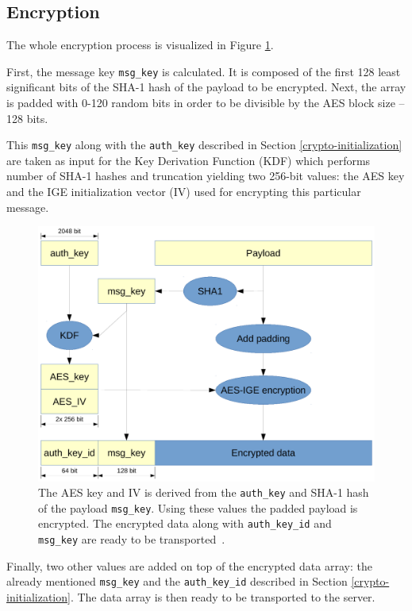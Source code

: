 \documentclass[thesis=M,english]{FITthesis}[2012/10/20]
\begin{document}
\subsection{Encryption}\label{crypto-regular-enc}

The whole encryption process is visualized in Figure \ref{img:crypto-regular-enc}.

First, the message key \texttt{msg\_key} is calculated. It is composed of the first 128 least significant bits of the SHA-1 hash of the payload to be encrypted. Next, the array is padded with 0-120 random bits in order to be divisible by the AES block size -- 128 bits.

This \texttt{msg\_key} along with the \texttt{auth\_key} described in Section \ref{crypto-initialization} are taken as input for the Key Derivation Function (KDF) which performs number of SHA-1 hashes and truncation yielding two 256-bit values: the AES key and the IGE initialization vector (IV) used for encrypting this particular message.

\begin{figure}[htb]
	\centering
	\includegraphics[width=1\textwidth]{mtproto-encflow.pdf}
	\caption[MTProto encryption flow]{The AES key and IV is derived from the \texttt{auth\_key} and SHA-1 hash of the payload \texttt{msg\_key}. Using these values the padded payload is encrypted. The encrypted data along with \texttt{auth\_key\_id} and \texttt{msg\_key} are ready to be transported~\cite{telegram-aarhus}.}
	\label{img:crypto-regular-enc}
\end{figure}

Finally, two other values are added on top of the encrypted data array: the already mentioned \texttt{msg\_key} and the \texttt{auth\_key\_id} described in Section \ref{crypto-initialization}. The data array is then ready to be transported to the server.
\end{document}
